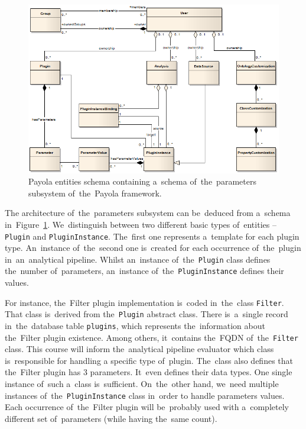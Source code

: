 \begin{figure}
	\centering
	\includegraphics[width=140mm]{img/params-schema.png}
	\caption{Payola entities schema containing a~schema of~the~parameters 
	subsystem of~the~Payola framework.~\cite{payola:dg}}
	\label{fig:params-schema}
\end{figure}

The architecture of~the~parameters subsystem can be~deduced
from a~schema in~Figure~\ref{fig:params-schema}. We~distinguish between two 
different basic types of~entities -- \texttt{Plugin} and \texttt{PluginInstance}. The~first 
one represents a~template for each plugin type. An~instance of~the~second one is~created for
each occurrence of~the~plugin in~an~analytical pipeline. Whilst an~instance of~the~\texttt{Plugin}
class defines the~number of~parameters, an~instance of~the~\texttt{PluginInstance} 
defines their values.

For instance, the~Filter plugin implementation is~coded in~the~class \texttt{Filter}.
That class is~derived from the~\texttt{Plugin} abstract class. There is~a~single record in~the~database table
\texttt{plugins}, which represents the~information about the~Filter plugin existence.
Among others, it~contains the~FQDN of~the~\texttt{Filter} class. This course will inform the~analytical
pipeline evaluator which class is~responsible for handling
a specific type of~plugin. The~class also defines that the~Filter plugin has 3 parameters. It~even 
defines their data types. One single instance of~such a~class is~sufficient. On~the~other hand, we~need
multiple instances of~the~\texttt{PluginInstance} class in~order to
handle parameters values. Each occurrence of~the~Filter plugin will be~probably 
used with a~completely different set of~parameters (while having the~same count).

